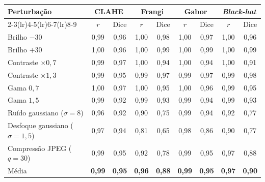 \begin{tabular}{lcccccccc}
\toprule
Perturbação & \multicolumn{2}{c}{CLAHE} & \multicolumn{2}{c}{Frangi} & \multicolumn{2}{c}{Gabor} & \multicolumn{2}{c}{\textit{Black-hat}} \\
\cmidrule(lr){2-3}\cmidrule(lr){4-5}\cmidrule(lr){6-7}\cmidrule(lr){8-9}
 & $r$ & Dice & $r$ & Dice & $r$ & Dice & $r$ & Dice \\
\midrule
Brilho $-30$ & 0,99 & 0,96 & 1,00 & 0,98 & 1,00 & 0,97 & 1,00 & 0,96 \\
Brilho $+30$ & 1,00 & 0,96 & 1,00 & 0,99 & 1,00 & 0,99 & 1,00 & 0,99 \\
Contraste $\times0{,}7$ & 0,99 & 0,97 & 1,00 & 0,94 & 1,00 & 0,94 & 1,00 & 0,91 \\
Contraste $\times1{,}3$ & 0,99 & 0,95 & 0,99 & 0,97 & 0,99 & 0,97 & 0,99 & 0,98 \\
Gama $0{,}7$ & 1,00 & 0,97 & 1,00 & 0,95 & 1,00 & 0,96 & 0,99 & 0,95 \\
Gama $1{,}5$ & 0,99 & 0,92 & 0,99 & 0,93 & 0,99 & 0,94 & 0,99 & 0,93 \\
Ruído gaussiano ($\sigma=8$) & 0,96 & 0,92 & 0,90 & 0,75 & 0,99 & 0,94 & 0,92 & 0,77 \\
Desfoque gaussiano ($\sigma=1{,}5$) & 0,97 & 0,94 & 0,81 & 0,65 & 0,98 & 0,86 & 0,90 & 0,77 \\
Compressão JPEG ($q=30$) & 0,99 & 0,95 & 0,92 & 0,78 & 0,99 & 0,95 & 0,97 & 0,88 \\
\midrule
Média & \textbf{0,99} & \textbf{0,95} & \textbf{0,96} & \textbf{0,88} & \textbf{0,99} & \textbf{0,95} & \textbf{0,97} & \textbf{0,90} \\
\bottomrule
\end{tabular}
